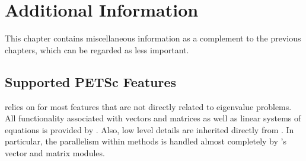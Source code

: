 \chapter{\label{cap:add}Additional Information}

\noindent This chapter contains miscellaneous information as a complement to the previous chapters, which can be regarded as less important.

\section{Supported PETSc Features}

\slepc relies on \petsc for most features that are not directly related to eigenvalue problems. All functionality associated with vectors and matrices as well as linear systems of equations is provided by \petsc. Also, low level details are inherited directly from \petsc. In particular, the parallelism within \slepc methods is handled almost completely by \petsc's vector and matrix modules. 

